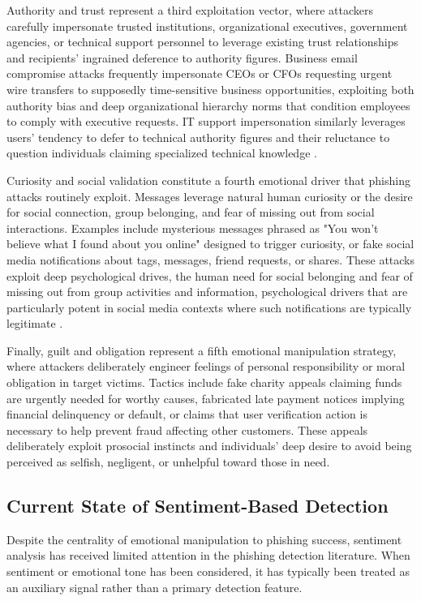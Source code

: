 Authority and trust represent a third exploitation vector, where attackers carefully impersonate trusted institutions, organizational executives, government agencies, or technical support personnel to leverage existing trust relationships and recipients' ingrained deference to authority figures. Business email compromise attacks frequently impersonate CEOs or CFOs requesting urgent wire transfers to supposedly time-sensitive business opportunities, exploiting both authority bias and deep organizational hierarchy norms that condition employees to comply with executive requests. IT support impersonation similarly leverages users' tendency to defer to technical authority figures and their reluctance to question individuals claiming specialized technical knowledge \cite{krombholz2015advanced}.

Curiosity and social validation constitute a fourth emotional driver that phishing attacks routinely exploit. Messages leverage natural human curiosity or the desire for social connection, group belonging, and fear of missing out from social interactions. Examples include mysterious messages phrased as "You won't believe what I found about you online" designed to trigger curiosity, or fake social media notifications about tags, messages, friend requests, or shares. These attacks exploit deep psychological drives, the human need for social belonging and fear of missing out from group activities and information, psychological drivers that are particularly potent in social media contexts where such notifications are typically legitimate \cite{EDWARDS201718}.

Finally, guilt and obligation represent a fifth emotional manipulation strategy, where attackers deliberately engineer feelings of personal responsibility or moral obligation in target victims. Tactics include fake charity appeals claiming funds are urgently needed for worthy causes, fabricated late payment notices implying financial delinquency or default, or claims that user verification action is necessary to help prevent fraud affecting other customers. These appeals deliberately exploit prosocial instincts and individuals' deep desire to avoid being perceived as selfish, negligent, or unhelpful toward those in need.

\subsection{Current State of Sentiment-Based Detection}

Despite the centrality of emotional manipulation to phishing success, sentiment analysis has received limited attention in the phishing detection literature. When sentiment or emotional tone has been considered, it has typically been treated as an auxiliary signal rather than a primary detection feature.

